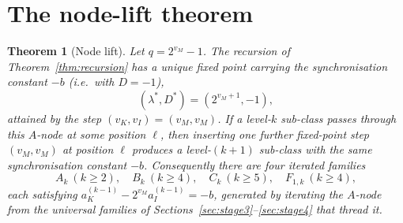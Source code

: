 \documentclass[11pt,reqno]{amsart}
\theoremstyle{plain}
\newtheorem{theorem}{Theorem}[section]
\theoremstyle{definition}
\theoremstyle{remark}
\newcommand{\vk}{v_{K}}
\newcommand{\vi}{v_{I}}
\newcommand{\aK}{a_{K}}
\newcommand{\aI}{a_{I}}
\newcommand{\vM}{v_{M}}
\begin{document}
\section{The node-lift theorem}\label{sec:nodelift}

\begin{theorem}[Node lift]\label{thm:node-lift}
Let $q = 2^{\vM} - 1$. The recursion of Theorem~\ref{thm:recursion} has a
unique fixed point carrying the synchronisation constant $-b$ (i.e.\ with
$D = -1$),
\[
(\lambda^*, D^*) = (2^{\vM + 1}, -1),
\]
attained by the step $(\vk, \vi) = (\vM, \vM)$. If a level-$k$ sub-class
passes through this $A$-node at some position $\ell$, then inserting one
further fixed-point step $(\vM, \vM)$ at position $\ell$ produces a level-$(k+1)$
sub-class with the same synchronisation constant $-b$. Consequently there are
four iterated families
\[
A_k\ (k \ge 2), \quad B_k\ (k \ge 4), \quad C_k\ (k \ge 5), \quad F_{1,k}\ (k \ge 4),
\]
each satisfying $\aK^{(k-1)} - 2^{\vM}\aI^{(k-1)} = -b$, generated by
iterating the $A$-node from the universal families of
Sections~\ref{sec:stage3}--\ref{sec:stage4} that thread it.
\end{theorem}
\end{document}
